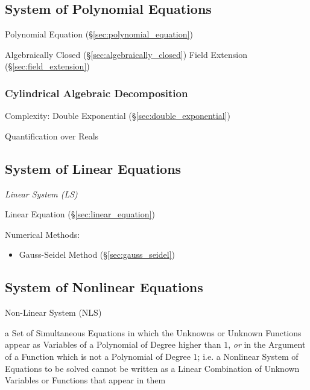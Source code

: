 \subsection{System of Polynomial Equations}
\label{sec:system_of_polynomials}

Polynomial Equation (\S\ref{sec:polynomial_equation})

Algebraically Closed (\S\ref{sec:algebraically_closed}) Field
Extension (\S\ref{sec:field_extension})



\subsubsection{Cylindrical Algebraic Decomposition}
\label{sec:algebraic_decomposition}

Complexity: Double Exponential (\S\ref{sec:double_exponential})

Quantification over Reals



\subsection{System of Linear Equations}
\label{sec:system_of_linear_equations}

\emph{Linear System (LS)}

Linear Equation (\S\ref{sec:linear_equation})

Numerical Methods:
\begin{itemize}
  \item Gauss-Seidel Method (\S\ref{sec:gauss_seidel})
\end{itemize}



\subsection{System of Nonlinear Equations}
\label{sec:system_of_nonlinear_equations}

Non-Linear System (NLS)

a Set of Simultaneous Equations in which the Unknowns or Unknown Functions
appear as Variables of a Polynomial of Degree higher than $1$, \emph{or} in the
Argument of a Function which is not a Polynomial of Degree $1$; i.e. a
Nonlinear System of Equations to be solved cannot be written as a Linear
Combination of Unknown Variables or Functions that appear in them



